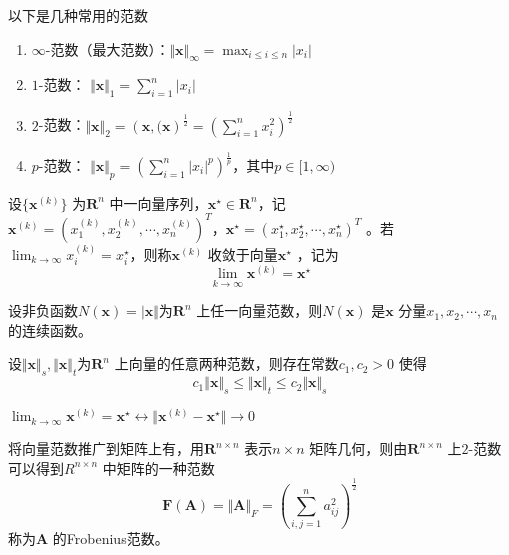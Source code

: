 \documentclass[a4paper]{article}
\begin{document}
以下是几种常用的范数
\begin{enumerate}
	\item $\infty$-范数（最大范数）：$\Vert \mathbf{x} \Vert_{\infty} = \max_{i \le i \le n} | x_i |$
	\item $1$-范数： $\Vert \mathbf{x} \Vert_1 = \sum_{i=1}^{n} | x_{i} |$ 
	\item $2$-范数：$\Vert \mathbf{x} \Vert_2 = (\mathbf{x}, \mathbf{(x})^{\frac{1}{2}} = (\sum_{i=1}^{n} x_i^2)^{\frac{1}{2}}$
	\item $p$-范数： $\Vert \mathbf{x} \Vert_p = (\sum_{i=1}^{n} |x_i|^{p}) ^{\frac{1}{p}}$，其中$p \in [1, \infty)$
\end{enumerate}

\begin{definition}
	设$\{\mathbf{x}^{(k)}\} $ 为$\mathbf{R}^{n}$ 中一向量序列，$\mathbf{x}^{\star} \in \mathbf{R}^{n}$，记$\mathbf{x}^{(k)} = (x_1^{(k)}, x_2^{(k)}, \cdots, x_{n}^{(k)})^{T}，\mathbf{x}^{\star} = (x_1^{\star}, x_2^{\star}, \cdots, x_{n}^{\star})^{T}$ 。若$\lim_{k \to \infty} x_{i}^{(k)} = x_{i}^{\star}$，则称$\mathbf{x}^{(k)}$ 收敛于向量$\mathbf{x}^{\star}$ ，记为
	\[
	\lim_{k \to \infty} \mathbf{x}^{(k)} = \mathbf{x}^{\star}
	\] 
\end{definition}

\begin{theorem}
	设非负函数$N(\mathbf{x}) = \vert \mathbf{x} \Vert$为$\mathbf{R}^{n}$ 上任一向量范数，则$N(\mathbf{x})$ 是$\mathbf{x}$ 分量$x_1, x_2, \cdots, x_{n}$的连续函数。
\end{theorem}

\begin{theorem}
	设$\Vert \mathbf{x} \Vert_s, \Vert \mathbf{x} \Vert_t$为$\mathbf{R}^{n}$ 上向量的任意两种范数，则存在常数$c_1, c_2 > 0$ 使得
	\[
	c_1 \Vert \mathbf{x} \Vert_s \le \Vert \mathbf{x} \Vert_t \le c_2 \Vert \mathbf{x} \Vert_s
	\] 
\end{theorem}

\begin{theorem}
	$\lim_{k \to \infty} \mathbf{x}^{(k)} = \mathbf{x}^{\star} \leftrightarrow \Vert \mathbf{x}^{(k)} - \mathbf{x}^{\star} \Vert \to 0$
\end{theorem}

将向量范数推广到矩阵上有，用$\mathbf{R}^{n \times n}$ 表示$n \times n$ 矩阵几何，则由$\mathbf{R}^{n \times n}$ 上$2$-范数可以得到$R^{n \times n}$ 中矩阵的一种范数
\[
	\mathbf{F}(\mathbf{A}) = \Vert \mathbf{A} \Vert_F = (\sum_{i,j=1}^{n} a_{ij}^2)^{\frac{1}{2}}
\] 
称为$\mathbf{A}$ 的Frobenius范数。
\end{document}
